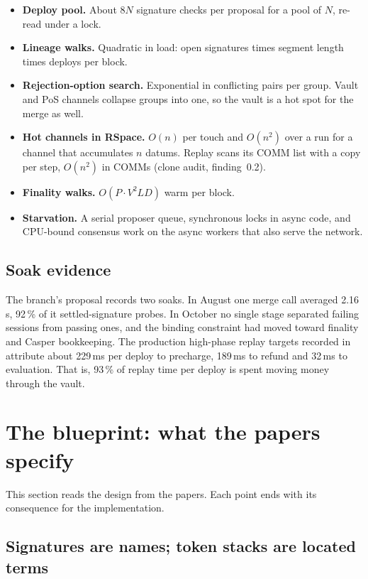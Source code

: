 \documentclass[11pt]{article}
\newcommand{\code}{\path}
\begin{document}
\begin{itemize}
\item \textbf{Deploy pool.} About $8N$ signature checks per proposal for a pool of $N$, re-read under a lock.
\item \textbf{Lineage walks.} Quadratic in load: open signatures times segment length times deploys per block.
\item \textbf{Rejection-option search.} Exponential in conflicting pairs per group. Vault and PoS channels collapse groups into one, so the vault is a hot spot for the merge as well.
\item \textbf{Hot channels in RSpace.} $O(n)$ per touch and $O(n^2)$ over a run for a channel that accumulates $n$ datums. Replay scans its COMM list with a copy per step, $O(n^2)$ in COMMs (clone audit, finding~0.2).
\item \textbf{Finality walks.} $O(P \cdot V^2 L D)$ warm per block.
\item \textbf{Starvation.} A serial proposer queue, synchronous locks in async code, and CPU-bound consensus work on the async workers that also serve the network.
\end{itemize}

\subsection{Soak evidence}

The branch's proposal records two soaks. In August one merge call averaged 2.16\,s, 92\,\% of it settled-signature probes. In October no single stage separated failing sessions from passing ones, and the binding constraint had moved toward finality and Casper bookkeeping. The production high-phase replay targets recorded in \code{cost_accounting_perf_spec.rs} attribute about 229\,ms per deploy to precharge, 189\,ms to refund and 32\,ms to evaluation. That is, 93\,\% of replay time per deploy is spent moving money through the vault.

\section{The blueprint: what the papers specify}\label{sec:blueprint}

This section reads the design from the papers. Each point ends with its consequence for the implementation.

\subsection{Signatures are names; token stacks are located terms}
\end{document}
